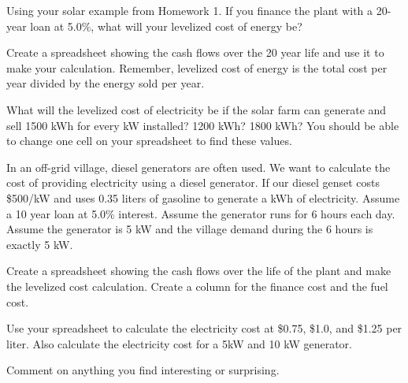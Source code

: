 \documentclass{article}
\begin{document}

Using your solar example from Homework 1.  If you finance the plant with
a 20-year loan at 5.0\%, what will your levelized cost of energy be?

Create a spreadsheet showing the cash flows over the 20 year life and
use it to make your calculation.  Remember, levelized cost of energy is
the total cost per year divided by the energy sold per year.

What will the levelized cost of electricity be if the solar farm can
generate and sell 1500 kWh for every kW installed?  1200 kWh? 1800 kWh?
You should be able to change one cell on your spreadsheet to find these
values.




In an off-grid village, diesel generators are often used.  We want to
calculate the cost of providing electricity using a diesel generator.
If our diesel genset costs \$500/kW and uses 0.35 liters of gasoline to
generate a kWh of electricity.  Assume a 10 year loan at 5.0\% interest.
Assume the generator runs for 6 hours each day.  Assume the generator is 5
kW and the village demand during the 6 hours is exactly 5 kW.

Create a spreadsheet showing the cash flows over the life of the plant
and make the levelized cost calculation.  Create a column for the
finance cost and the fuel cost.

Use your spreadsheet to calculate the electricity cost at \$0.75, \$1.0,
and \$1.25 per liter.  Also calculate the electricity cost for a 5kW and
10 kW generator.

Comment on anything you find interesting or surprising.
\end{document}
